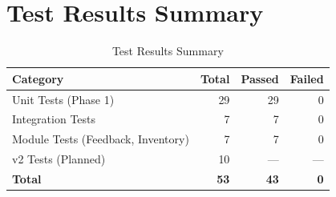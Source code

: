 \section{Test Results Summary}
\begin{table}[H]
\centering
\caption{Test Results Summary}
\label{tab:test-results}
\begin{tabularx}{\textwidth}{@{}lrrr@{}}
\toprule
Category & Total & Passed & Failed \\
\midrule
Unit Tests (Phase 1) & 29 & 29 & 0 \\
Integration Tests & 7 & 7 & 0 \\
Module Tests (Feedback, Inventory) & 7 & 7 & 0 \\
v2 Tests (Planned) & 10 & --- & --- \\
\midrule
\textbf{Total} & \textbf{53} & \textbf{43} & \textbf{0} \\
\bottomrule
\end{tabularx}
\end{table}
